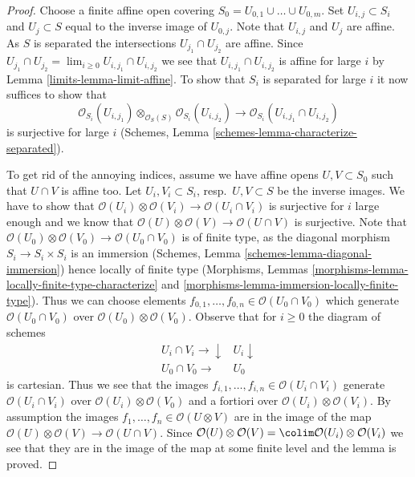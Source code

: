 \begin{proof}

Choose a finite affine open covering
$S_0 = U_{0, 1} \cup \ldots \cup U_{0, m}$.
Set $U_{i, j} \subset S_i$ and $U_j \subset S$
equal to the inverse image of $U_{0, j}$.
Note that $U_{i, j}$ and $U_j$ are affine. As $S$ is separated
the intersections $U_{j_1} \cap U_{j_2}$ are affine. Since
$U_{j_1} \cap U_{j_2} = \lim_{i \geq 0} U_{i, j_1} \cap U_{i, j_2}$
we see that $U_{i, j_1} \cap U_{i, j_2}$ is affine for large $i$
by Lemma \ref{limits-lemma-limit-affine}. To show that $S_i$ is separated
for large $i$ it now suffices to show that
$$
\mathcal{O}_{S_i}(U_{i, j_1})
\otimes_{\mathcal{O}_S(S)}
\mathcal{O}_{S_i}(U_{i, j_2})
\longrightarrow
\mathcal{O}_{S_i}(U_{i, j_1} \cap U_{i, j_2})
$$
is surjective for large $i$
(Schemes, Lemma \ref{schemes-lemma-characterize-separated}).

\medskip\noindent
To get rid of the annoying indices, assume we have affine opens
$U, V \subset S_0$ such that $U \cap V$ is affine too.
Let $U_i, V_i \subset S_i$, resp.\ $U, V \subset S$ be the inverse images.
We have to show that
$\mathcal{O}(U_i) \otimes \mathcal{O}(V_i) \to
\mathcal{O}(U_i \cap V_i)$
is surjective for $i$ large enough and we know that
$\mathcal{O}(U) \otimes \mathcal{O}(V) \to \mathcal{O}(U \cap V)$
is surjective. Note that
$\mathcal{O}(U_0) \otimes \mathcal{O}(V_0) \to
\mathcal{O}(U_0 \cap V_0)$
is of finite type, as the diagonal morphism $S_i \to S_i \times S_i$
is an immersion (Schemes, Lemma \ref{schemes-lemma-diagonal-immersion})
hence locally of finite type
(Morphisms, Lemmas \ref{morphisms-lemma-locally-finite-type-characterize} and
\ref{morphisms-lemma-immersion-locally-finite-type}).
Thus we can choose elements
$f_{0, 1}, \ldots, f_{0, n} \in \mathcal{O}(U_0 \cap V_0)$
which generate $\mathcal{O}(U_0 \cap V_0)$ over
$\mathcal{O}(U_0) \otimes \mathcal{O}(V_0)$.
Observe that for $i \geq 0$ the diagram of schemes
$$
\begin{array}{cc}U_i \cap V_i \longrightarrow\downarrow & U_i \downarrow \\ U_0 \cap V_0 \longrightarrow & U_0\end{array}
$$
is cartesian. Thus we see that the images
$f_{i, 1}, \ldots, f_{i, n} \in \mathcal{O}(U_i \cap V_i)$
generate $\mathcal{O}(U_i \cap V_i)$ over
$\mathcal{O}(U_i) \otimes \mathcal{O}(V_0)$
and a fortiori over
$\mathcal{O}(U_i) \otimes \mathcal{O}(V_i)$.
By assumption the images $f_1, \ldots, f_n \in \mathcal{O}(U \otimes V)$
are in the image of the map
$\mathcal{O}(U) \otimes \mathcal{O}(V) \to \mathcal{O}(U \cap V)$.
Since
$\mathcal{O}(U) \otimes \mathcal{O}(V) =
\colim \mathcal{O}(U_i) \otimes \mathcal{O}(V_i)$
we see that they are in the image of the map at some finite level
and the lemma is proved.
\end{proof}


